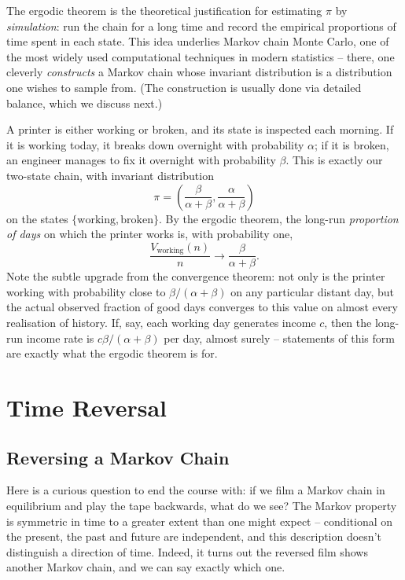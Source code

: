 \begin{remark}
	The ergodic theorem is the theoretical justification for estimating $\pi$ by \emph{simulation}: run the chain for a long time and record the empirical proportions of time spent in each state. This idea underlies Markov chain Monte Carlo, one of the most widely used computational techniques in modern statistics -- there, one cleverly \emph{constructs} a Markov chain whose invariant distribution is a distribution one wishes to sample from. (The construction is usually done via detailed balance, which we discuss next.)
\end{remark}

\begin{example}
	A printer is either working or broken, and its state is inspected each morning. If it is working today, it breaks down overnight with probability $\alpha$; if it is broken, an engineer manages to fix it overnight with probability $\beta$. This is exactly our two-state chain, with invariant distribution
	$$
	\pi = \left(\frac{\beta}{\alpha + \beta}, \frac{\alpha}{\alpha + \beta}\right)
	$$
	on the states $\{\text{working}, \text{broken}\}$. By the ergodic theorem, the long-run \emph{proportion of days} on which the printer works is, with probability one,
	$$
	\frac{V_{\text{working}}(n)}{n} \rightarrow \frac{\beta}{\alpha + \beta}.
	$$
	Note the subtle upgrade from the convergence theorem: not only is the printer working with probability close to $\beta/(\alpha + \beta)$ on any particular distant day, but the actual observed fraction of good days converges to this value on almost every realisation of history. If, say, each working day generates income $c$, then the long-run income rate is $c\beta/(\alpha + \beta)$ per day, almost surely -- statements of this form are exactly what the ergodic theorem is for.
\end{example}

\section{Time Reversal}

\subsection{Reversing a Markov Chain}

Here is a curious question to end the course with: if we film a Markov chain in equilibrium and play the tape backwards, what do we see? The Markov property is symmetric in time to a greater extent than one might expect -- conditional on the present, the past and future are independent, and this description doesn't distinguish a direction of time. Indeed, it turns out the reversed film shows another Markov chain, and we can say exactly which one.

